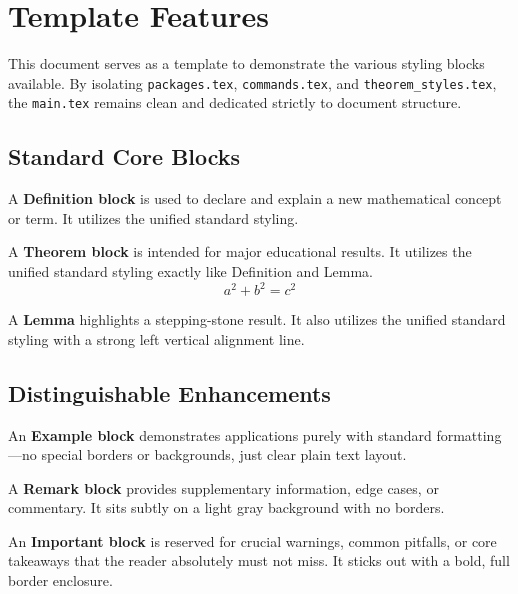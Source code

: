 \section{Template Features}

This document serves as a template to demonstrate the various styling blocks available. By isolating \texttt{packages.tex}, \texttt{commands.tex}, and \texttt{theorem\_styles.tex}, the \texttt{main.tex} remains clean and dedicated strictly to document structure.

\subsection{Standard Core Blocks}

\begin{definition}
A \textbf{Definition block} is used to declare and explain a new mathematical concept or term. It utilizes the unified standard styling.
\end{definition}

\begin{theorem}
A \textbf{Theorem block} is intended for major educational results. It utilizes the unified standard styling exactly like Definition and Lemma.
$$ a^2 + b^2 = c^2 $$
\end{theorem}

\begin{lemma}
A \textbf{Lemma} highlights a stepping-stone result. It also utilizes the unified standard styling with a strong left vertical alignment line.
\end{lemma}

\subsection{Distinguishable Enhancements}

\begin{example}
An \textbf{Example block} demonstrates applications purely with standard formatting—no special borders or backgrounds, just clear plain text layout.
\end{example}

\begin{remark}
A \textbf{Remark block} provides supplementary information, edge cases, or commentary. It sits subtly on a light gray background with no borders.
\end{remark}

\begin{important}
An \textbf{Important block} is reserved for crucial warnings, common pitfalls, or core takeaways that the reader absolutely must not miss. It sticks out with a bold, full border enclosure.
\end{important}

